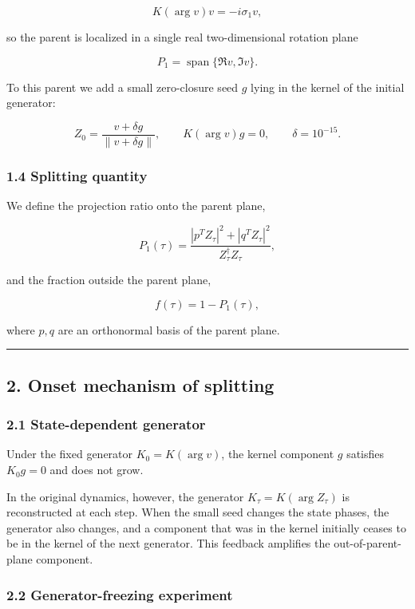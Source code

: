 \documentclass[
  a4paper,
]{article}
\begin{document}
\[
K(\arg v)v=-i\sigma_1 v,
\]

so the parent is localized in a single real two-dimensional rotation
plane

\[
P_1=\operatorname{span}\{\Re v,\Im v\}.
\]

To this parent we add a small zero-closure seed \(g\) lying in the
kernel of the initial generator:

\[
Z_0=\frac{v+\delta g}{\|v+\delta g\|},
\qquad
K(\arg v)g=0,
\qquad
\delta=10^{-15}.
\]

\subsubsection{1.4 Splitting quantity}\label{splitting-quantity}

We define the projection ratio onto the parent plane,

\[
P_1(\tau)
=
\frac{|p^T Z_\tau|^2+|q^T Z_\tau|^2}{Z_\tau^\dagger Z_\tau},
\]

and the fraction outside the parent plane,

\[
f(\tau)=1-P_1(\tau),
\]

where \(p,q\) are an orthonormal basis of the parent plane.

\begin{center}\rule{0.5\linewidth}{0.5pt}\end{center}

\subsection{2. Onset mechanism of
splitting}\label{onset-mechanism-of-splitting}

\subsubsection{2.1 State-dependent
generator}\label{state-dependent-generator}

Under the fixed generator \(K_0=K(\arg v)\), the kernel component \(g\)
satisfies \(K_0g=0\) and does not grow.

In the original dynamics, however, the generator
\(K_\tau=K(\arg Z_\tau)\) is reconstructed at each step. When the small
seed changes the state phases, the generator also changes, and a
component that was in the kernel initially ceases to be in the kernel of
the next generator. This feedback amplifies the out-of-parent-plane
component.

\subsubsection{2.2 Generator-freezing
experiment}\label{generator-freezing-experiment}
\end{document}
